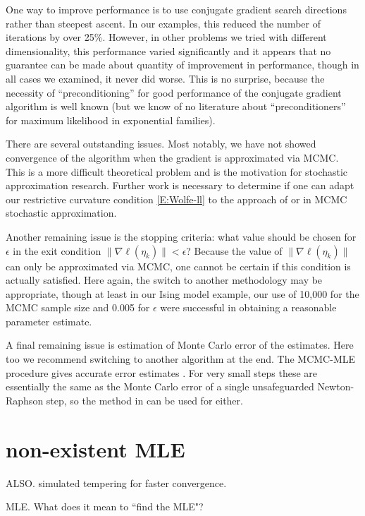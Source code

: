 One way to improve performance is to use conjugate gradient search directions rather 
than steepest ascent.  In our 
examples, this reduced the number of iterations by over 25\%.  However, in other 
problems we tried with different 
dimensionality, this performance varied significantly and it appears that no guarantee 
can be made about quantity of 
improvement in performance, though in all cases we examined, it never did worse.  This 
is no surprise, because the
necessity of ``preconditioning'' for good performance of the conjugate gradient 
algorithm is well known (but 
we know of no literature about ``preconditioners'' for 
maximum likelihood in exponential families).

There are several outstanding issues.  Most notably, we have not showed convergence of 
the algorithm when the gradient 
is approximated via MCMC.  This is a more difficult theoretical problem and is the 
motivation for stochastic 
approximation research.  
Further work is necessary to determine if one can adapt our restrictive curvature 
condition \eqref{E:Wolfe-ll} to the 
approach of \citet{Andrieu:2005} or \citet{Liang:2010} in MCMC stochastic 
approximation.  

Another remaining issue is the stopping criteria: what value should be chosen for $
\epsilon$ in the exit condition
$\lVert  \nabla \ell( \eta_k ) \rVert < \epsilon$?  Because the value of $\lVert  
\nabla \ell( \eta_k ) \rVert$ can only 
be approximated via MCMC, one cannot be certain if this condition is actually 
satisfied.  Here again, the switch to 
another methodology may be appropriate, though at least in our Ising model example, 
our use of 10,000 for the MCMC 
sample size and 0.005 for $\epsilon$ were successful in obtaining a reasonable 
parameter estimate. 

 A final remaining issue is estimation of Monte Carlo error of the estimates.  Here 
too we recommend switching to another
algorithm at the end.  The MCMC-MLE procedure gives accurate error estimates 
\citep{Geyer:1994}.
For very small steps these are essentially the same as the Monte Carlo error of a 
single unsafeguarded Newton-Raphson step,
so the method in \citep{Geyer:1994} can be used for either.

\section{non-existent MLE}
ALSO.  simulated tempering for faster convergence.

MLE.  What does it mean to ``find the MLE"?
